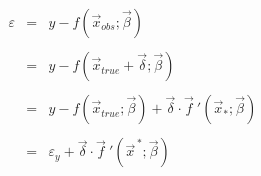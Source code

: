 

\(
\begin{array}{ccl}
\varepsilon & = & y - f(\vec{x}_{obs};\vec{\beta}) \\
            &   & \\
            & = & y - f(\vec{x}_{true}+\vec{\delta};\vec{\beta})  \\
            &   & \\
            & = & y - f(\vec{x}_{true};\vec{\beta}) + \vec{\delta}\!\cdot\!\!\vec{f}\:'(\vec{x}_*;\vec{\beta}) \\
            &   & \\
            & = & \varepsilon_y + \vec{\delta}\!\cdot\!\!\vec{f}\:'(\vec{x}^{\,*};\vec{\beta})
\end{array}
\)


